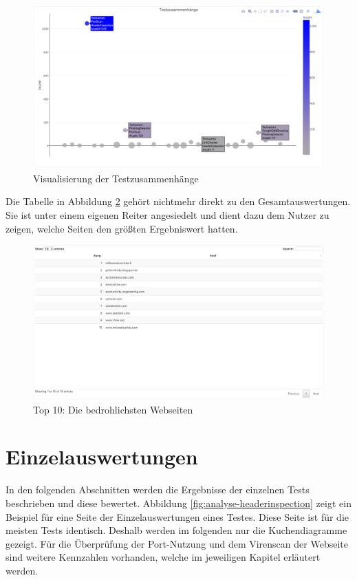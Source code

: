 \begin{figure}[H]
  \centering
  \includegraphics[width=15cm]{images/stats/testzusammenhaenge}
  \caption[Visualisierung der Testzusammenhänge]{Visualisierung der Testzusammenhänge\protect\footnotemark}
  \label{fig:analyse-testzusammenhaenge}
\end{figure}

Die Tabelle in Abbildung \ref{fig:analyse-top10} gehört nichtmehr direkt zu den Gesamtauswertungen. Sie ist unter einem eigenen Reiter angesiedelt und dient dazu dem Nutzer zu zeigen, welche Seiten den größten Ergebniswert hatten.
\begin{figure}[H]
  \centering
  \includegraphics[width=15cm]{images/stats/top10}
  \caption[Top 10: Die bedrohlichsten Webseiten]{Top 10: Die bedrohlichsten Webseiten\protect\footnotemark}
  \label{fig:analyse-top10}
\end{figure}

\section{Einzelauswertungen}
In den folgenden Abschnitten werden die Ergebnisse der einzelnen Tests beschrieben und diese bewertet. Abbildung \ref{fig:analyse-headerinspection} zeigt ein Beispiel für eine Seite der Einzelauswertungen eines Testes. Diese Seite ist für die meisten Tests identisch. Deshalb werden im folgenden nur die Kuchendiagramme gezeigt. Für die Überprüfung der Port-Nutzung und dem Virenscan der Webseite sind weitere Kennzahlen vorhanden, welche im jeweiligen Kapitel erläutert werden.

